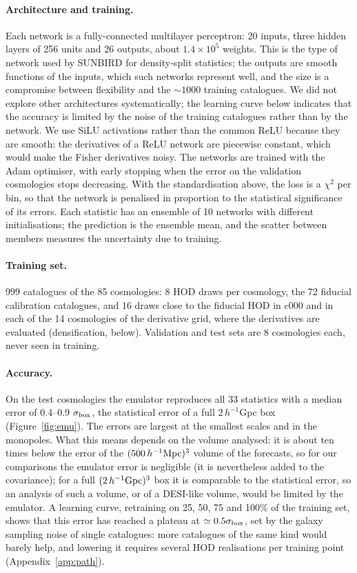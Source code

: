 \paragraph{Architecture and training.} Each network is a fully-connected multilayer perceptron: 20 inputs, three hidden layers of 256 units and 26 outputs, about $1.4\times10^5$ weights. This is the type of network used by SUNBIRD \cite{CuestaLazaro2024} for density-split statistics; the outputs are smooth functions of the inputs, which such networks represent well, and the size is a compromise between flexibility and the $\sim1000$ training catalogues. We did not explore other architectures systematically; the learning curve below indicates that the accuracy is limited by the noise of the training catalogues rather than by the network. We use SiLU activations rather than the common ReLU because they are smooth: the derivatives of a ReLU network are piecewise constant, which would make the Fisher derivatives noisy. The networks are trained with the Adam optimiser, with early stopping when the error on the validation cosmologies stops decreasing. With the standardisation above, the loss is a $\chi^2$ per bin, so that the network is penalised in proportion to the statistical significance of its errors. Each statistic has an ensemble of 10 networks with different initialisations; the prediction is the ensemble mean, and the scatter between members measures the uncertainty due to training.

\paragraph{Training set.} 999 catalogues of the 85 cosmologies: 8 HOD draws per cosmology, the 72 fiducial calibration catalogues, and 16 draws close to the fiducial HOD in c000 and in each of the 14 cosmologies of the derivative grid, where the derivatives are evaluated (densification, below). Validation and test sets are 8 cosmologies each, never seen in training.

\paragraph{Accuracy.} On the test cosmologies the emulator reproduces all 33 statistics with a median error of 0.4--0.9 $\sigma_{\rm box}$, the statistical error of a full $2\,h^{-1}$Gpc box (Figure~\ref{fig:emu}). The errors are largest at the smallest scales and in the monopoles. What this means depends on the volume analysed: it is about ten times below the error of the $(500\,h^{-1}\mathrm{Mpc})^3$ volume of the forecasts, so for our comparisons the emulator error is negligible (it is nevertheless added to the covariance); for a full $(2\,h^{-1}{\rm Gpc})^3$ box it is comparable to the statistical error, so an analysis of such a volume, or of a DESI-like volume, would be limited by the emulator. A learning curve, retraining on 25, 50, 75 and 100\% of the training set, shows that this error has reached a plateau at $\simeq0.5\sigma_{\rm box}$, set by the galaxy sampling noise of single catalogues: more catalogues of the same kind would barely help, and lowering it requires several HOD realisations per training point (Appendix~\ref{app:path}).

